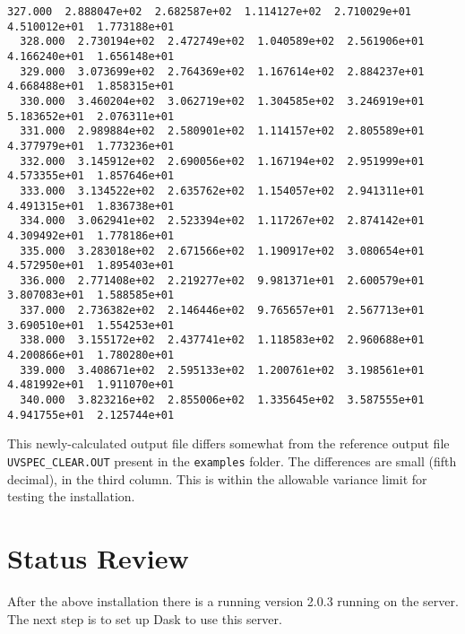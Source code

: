 \begin{lstlisting}[style=tinysize]
  327.000  2.888047e+02  2.682587e+02  1.114127e+02  2.710029e+01  4.510012e+01  1.773188e+01 
  328.000  2.730194e+02  2.472749e+02  1.040589e+02  2.561906e+01  4.166240e+01  1.656148e+01 
  329.000  3.073699e+02  2.764369e+02  1.167614e+02  2.884237e+01  4.668488e+01  1.858315e+01 
  330.000  3.460204e+02  3.062719e+02  1.304585e+02  3.246919e+01  5.183652e+01  2.076311e+01 
  331.000  2.989884e+02  2.580901e+02  1.114157e+02  2.805589e+01  4.377979e+01  1.773236e+01 
  332.000  3.145912e+02  2.690056e+02  1.167194e+02  2.951999e+01  4.573355e+01  1.857646e+01 
  333.000  3.134522e+02  2.635762e+02  1.154057e+02  2.941311e+01  4.491315e+01  1.836738e+01 
  334.000  3.062941e+02  2.523394e+02  1.117267e+02  2.874142e+01  4.309492e+01  1.778186e+01 
  335.000  3.283018e+02  2.671566e+02  1.190917e+02  3.080654e+01  4.572950e+01  1.895403e+01 
  336.000  2.771408e+02  2.219277e+02  9.981371e+01  2.600579e+01  3.807083e+01  1.588585e+01 
  337.000  2.736382e+02  2.146446e+02  9.765657e+01  2.567713e+01  3.690510e+01  1.554253e+01 
  338.000  3.155172e+02  2.437741e+02  1.118583e+02  2.960688e+01  4.200866e+01  1.780280e+01 
  339.000  3.408671e+02  2.595133e+02  1.200761e+02  3.198561e+01  4.481992e+01  1.911070e+01 
  340.000  3.823216e+02  2.855006e+02  1.335645e+02  3.587555e+01  4.941755e+01  2.125744e+01 
\end{lstlisting}

This newly-calculated output file differs somewhat from the reference output file \lstinline{UVSPEC_CLEAR.OUT} present in the \lstinline{examples} folder.  The differences are small (fifth decimal), in the third column.  This is within the allowable variance limit for testing the installation.

\section{Status Review}

After the above installation there is a running \libradtran{} version 2.0.3 running on the server. The next step is to set up Dask to use this server. 